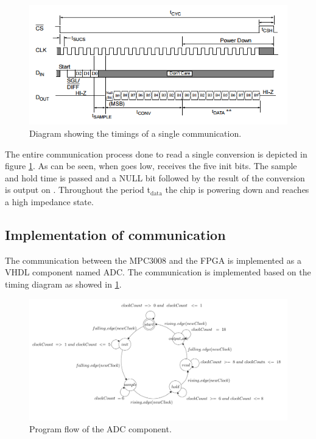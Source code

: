\begin{figure}[h!]
	\centering
	\includegraphics[width=\linewidth]{images/timing}
	\caption{Diagram showing the timings of a single communication.}
	\label{fig:timing}
\end{figure}

The entire communication process done to read a single conversion is depicted in figure \ref{fig:timing}. As can be seen, when \cs goes low, \din receives the five init bits. The sample and hold time is passed and a NULL bit followed by the result of the conversion is output on \dout. Throughout the period t$_\text{data}$ the chip is powering down and \dout reaches a high impedance state.
\subsection{Implementation of communication}
The communication between the MPC3008 and the FPGA is implemented as a VHDL component named ADC. 
The communication is implemented based on the timing diagram as showed in \ref{fig:timing}.  

\begin{figure}[h!]
	\centering
	\centerline{\includegraphics[width=18cm]{images/statemachine}}
	\caption{Program flow of the ADC component.}
	\label{fig:statemachine}
\end{figure}

